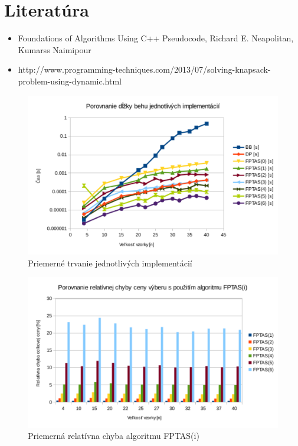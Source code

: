 \documentclass[slovak]{article}
\begin{document}
\section{Literatúra}

\begin{itemize}
	\item Foundations of Algorithms Using C++ Pseudocode, Richard E. Neapolitan, Kumarss Naimipour
	\item http://www.programming-techniques.com/2013/07/solving-knapsack-problem-using-dynamic.html
\end{itemize}


\begin{figure}\centering
	\includegraphics[scale=0.8]{./cas.pdf}
	\caption{Priemerné trvanie jednotlivých implementácií}
	\label{gr:graf1}
\end{figure}

\begin{figure}\centering
	\includegraphics[scale=0.8]{./chyba.pdf}
	\caption{Priemerná relatívna chyba algoritmu FPTAS(i)}
	\label{gr:graf2}
\end{figure}
\end{document}
